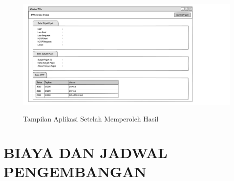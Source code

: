 \documentclass[pdftex,12pt, oneside]{article}
\begin{document}
\begin{figure}[H]
	\centering
	\includegraphics[width=1\textwidth]{./resources/content_page}
	\label{fig:ui-content}
	\caption{Tampilan Aplikasi Setelah Memperoleh Hasil}
\end{figure}

\section{BIAYA DAN JADWAL PENGEMBANGAN}
\end{document}
